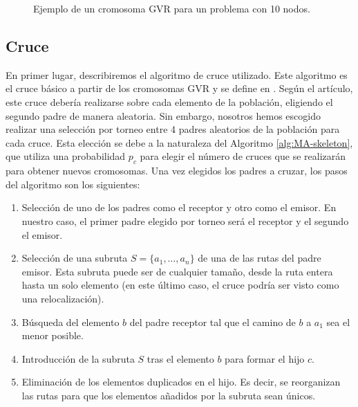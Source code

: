 \begin{figure}[t]
    \centering
    \caption{Ejemplo de un cromosoma GVR para un problema con 10 nodos.}
    \label{fig:GVR_crom}
\end{figure}

\subsection{Cruce}
En primer lugar, describiremos el algoritmo de cruce utilizado. Este algoritmo es el cruce básico a partir de los cromosomas GVR y se define en \cite{gvr}. Según el artículo, este cruce debería realizarse sobre cada elemento de la población, eligiendo el segundo padre de manera aleatoria. Sin embargo, nosotros hemos escogido realizar una selección por torneo entre 4 padres aleatorios de la población para cada cruce. Esta elección se debe a la naturaleza del Algoritmo \ref{alg:MA-skeleton}, que utiliza una probabilidad $p_c$ para elegir el número de cruces que se realizarán para obtener nuevos cromosomas. Una vez elegidos los padres a cruzar, los pasos del algoritmo son los siguientes:
\begin{enumerate}
    \item Selección de uno de los padres como el receptor y otro como el emisor. En nuestro caso, el primer padre elegido por torneo será el receptor y el segundo el emisor.
    \item Selección de una subruta $S=\{a_1,\ldots,a_n\}$ de una de las rutas del padre emisor. Esta subruta puede ser de cualquier tamaño, desde la ruta entera hasta un solo elemento (en este último caso, el cruce podría ser visto como una relocalización).
    \item Búsqueda del elemento $b$ del padre receptor tal que el camino de $b$ a $a_1$ sea el menor posible.
    \item Introducción de la subruta $S$ tras el elemento $b$ para formar el hijo $c$.
    \item Eliminación de los elementos duplicados en el hijo. Es decir, se reorganizan las rutas para que los elementos añadidos por la subruta sean únicos.
\end{enumerate}

